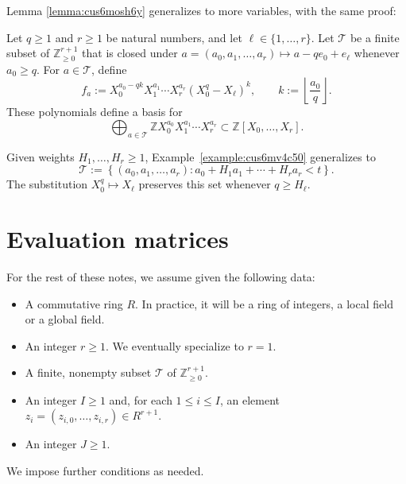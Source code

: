 \documentclass[reqno]{amsart} 
\begin{document}
Lemma \ref{lemma:cus6mosh6y} generalizes to more variables, with the same proof:
\begin{lemma}\label{lemma:cus64ddnsk}
  Let $q \geq 1$ and $r \geq 1$ be natural numbers, and let $\ell \in \{1, \dotsc, r\}$.  Let $\mathcal{T}$ be a finite subset of $\mathbb{Z}_{\geq 0}^{r + 1}$ that is closed under $a = (a_0, a_1, \dotsc, a_r) \mapsto a - q e_0 + e_\ell$ whenever $a_0 \geq q$.  For $a \in \mathcal{T}$, define
  \begin{equation*}
    f_{a} :=
    X_0^{a_0 - q k}
    X_1^{a_1} \dotsb X_r^{a_r}
    (X_0^q - X_\ell)^{k},
    \qquad k := \left\lfloor \frac{a_0}{q} \right\rfloor.
  \end{equation*}
  These polynomials define a basis for
  \begin{equation*}
    \bigoplus_{a \in \mathcal{T}} \mathbb{Z}
    X_0^{a_0} X_1^{a_1} \dotsb X_r^{a_r} \subset \mathbb{Z}[X_0, \dotsc, X_r].
  \end{equation*}
\end{lemma}
Given weights $H_1, \dotsc, H_r \geq 1$, Example~\ref{example:cus6mv4c50} generalizes to
\begin{equation*}
  \mathcal{T} := \left\{(a_0, a_1, \dotsc, a_r) : a_0 + H_1 a_1 + \dotsb + H_r a_r < t \right\}.
\end{equation*}
The substitution $X_0^q \mapsto X_\ell$ preserves this set whenever $q \geq H_\ell$.


\section{Evaluation matrices}\label{section:evaluation}\label{sec:cus6mz1ygp}
For the rest of these notes, we assume given the following data:
\begin{itemize}
\item A commutative ring $R$.  In practice, it will be a ring of integers, a local field or a global field.
\item An integer $r \geq 1$.  We eventually specialize to $r = 1$.
\item A finite, nonempty subset $\mathcal{T}$ of $\mathbb{Z}_{\geq 0}^{r + 1}$.
\item An integer $I \geq 1$ and, for each $1 \leq i \leq I$, an element $z_i = (z_{i,0}, \dotsc, z_{i,r}) \in R^{r + 1}$.
\item An integer $J \geq 1$.
\end{itemize}
We impose further conditions as needed.
\end{document}
